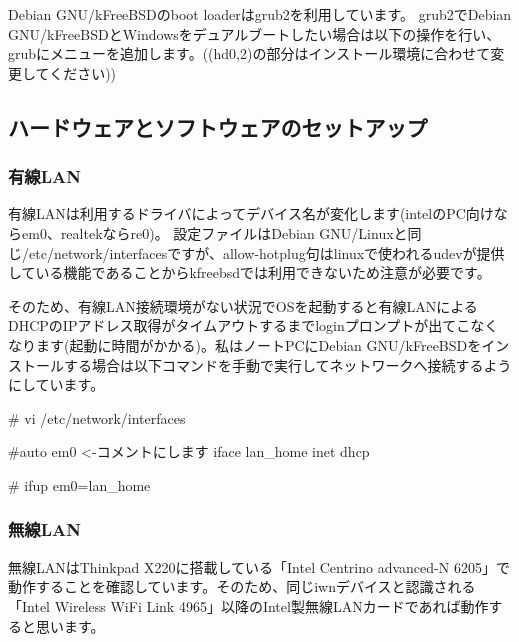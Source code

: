\documentclass[mingoth,a4paper]{jsarticle}
\begin{document}
Debian GNU/kFreeBSDのboot loaderはgrub2を利用しています。
grub2でDebian GNU/kFreeBSDとWindowsをデュアルブートしたい場合は以下の操作を行い、grubにメニューを追加します。((hd0,2)の部分はインストール環境に合わせて変更してください))


\subsection{ハードウェアとソフトウェアのセットアップ}
\subsubsection{有線LAN}

有線LANは利用するドライバによってデバイス名が変化します(intelのPC向けならem0、realtekならre0)。
設定ファイルはDebian GNU/Linuxと同じ/etc/network/interfacesですが、allow-hotplug句はlinuxで使われるudevが提供している機能であることからkfreebsdでは利用できないため注意が必要です。

そのため、有線LAN接続環境がない状況でOSを起動すると有線LANによるDHCPのIPアドレス取得がタイムアウトするまでloginプロンプトが出てこなくなります(起動に時間がかかる)。私はノートPCにDebian GNU/kFreeBSDをインストールする場合は以下コマンドを手動で実行してネットワークへ接続するようにしています。

\begin{commandline}
  # vi /etc/network/interfaces

  #auto em0  <-コメントにします
  iface lan_home inet dhcp

  
  # ifup em0=lan_home
\end{commandline}

\subsubsection{無線LAN}

無線LANはThinkpad X220に搭載している「Intel Centrino advanced-N 6205」で動作することを確認しています。そのため、同じiwnデバイスと認識される「Intel Wireless WiFi Link 4965」以降のIntel製無線LANカードであれば動作すると思います。
\end{document}
